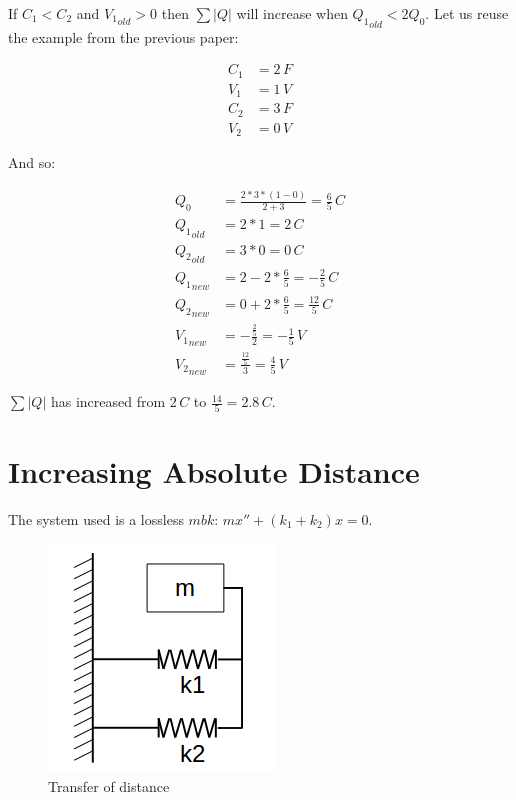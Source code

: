 \documentclass[]{elementary-physics}
\begin{document}
If $C_1 < C_2$ and ${V_1}_{old} > 0$ then $\sum |Q|$ will increase when ${Q_1}_{old} < 2 Q_0$.
Let us reuse the example from the previous paper\cite{ef2ch}:

\begin{subequations}
\begin{align}
C_1 &= 2 \, F \\
V_1 &= 1 \, V \\
C_2 &= 3 \, F \\
V_2 &= 0 \, V
\end{align}
\end{subequations}

And so:

\begin{subequations}
\begin{align}
Q_0 &= \frac{2 * 3 * (1-0)}{2 + 3} = \frac{6}{5} \, C \\
{Q_1}_{old} &= 2 * 1 = 2 \, C \\
{Q_2}_{old} &= 3 * 0 = 0 \, C \\
{Q_1}_{new} &= 2 -2 * \frac{6}{5} = -\frac{2}{5} \, C \\
{Q_2}_{new} &= 0 +2 * \frac{6}{5} = \frac{12}{5} \, C \\
{V_1}_{new} &= -\frac{\frac{2}{5}}{2} = -\frac{1}{5} \, V \\
{V_2}_{new} &= \frac{\frac{12}{5}}{3} = \frac{4}{5} \, V
\end{align}
\end{subequations}

$\sum |Q|$ has increased from $2 \, C$ to $\frac{14}{5} = 2.8 \, C$.

\section{Increasing Absolute Distance}

The system used is a lossless $mbk$\cite{ef3ch}: $m x'' + (k_1 + k_2) x = 0$.

\begin{figure}[ht] \centering
	\includegraphics[scale=.3]{kmk} \caption{Transfer of distance}
\end{figure}
\end{document}
